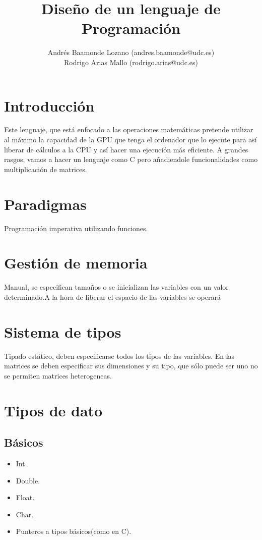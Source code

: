 \documentclass[12pt,a4paper]{article}
\title{Diseño de un lenguaje de Programación}
\author{Andrés Baamonde Lozano (andres.baamonde@udc.es)\\
	Rodrigo Arias Mallo (rodrigo.arias@udc.es)}
\begin{document}
\maketitle

\clearpage 

\tableofcontents

\clearpage 

\section{Introducción}
Este lenguaje, que está enfocado a las operaciones matemáticas pretende utilizar al máximo la capacidad de la GPU que tenga el ordenador que lo ejecute para así liberar de cálculos a la CPU y así hacer  una ejecución más eficiente. A grandes rasgos, vamos a hacer un lenguaje como C pero añadiendole funcionalidades como multiplicación de matrices.
\section{Paradigmas}
Programación imperativa utilizando funciones.
\section{Gestión de memoria}
Manual, se especifican tamaños o se inicializan las variables con un valor determinado.A la hora de liberar el espacio de las variables se operará
\section{Sistema de tipos}
Tipado estático, deben especificarse todos los tipos de las variables. En las matrices se deben especificar sus dimensiones y su tipo, que sólo puede ser uno no se permiten matrices heterogeneas. 
\section{Tipos de dato}
\subsection{Básicos}
\begin{itemize}
\item Int.
\item Double.
\item Float.
\item Char.
\item Punteros a tipos básicos(como en C).
\end{itemize}
\end{document}

